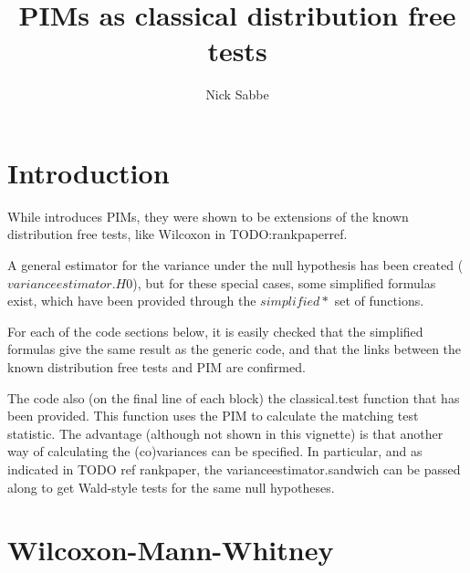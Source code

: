 \documentclass[12pt]{article}
\author{Nick Sabbe}
\begin{document}

\title{PIMs as classical distribution free tests}

\maketitle
\tableofcontents
\section{Introduction}

While \cite{Thas2012} introduces PIMs, they were shown to be extensions of the known distribution free tests, like Wilcoxon in TODO:rankpaperref.

A general estimator for the variance under the null hypothesis has been created ($varianceestimator.H0$), but for these special cases, some simplified
formulas exist, which have been provided through the $simplified*$ set of functions.

For each of the code sections below, it is easily checked that the simplified formulas give the same result as the generic code, and that the 
links between the known distribution free tests and PIM are confirmed.

The code also (on the final line of each block) the classical.test function that has been provided. This function uses the PIM to calculate the 
matching test statistic. The advantage (although not shown in this vignette) is that another way of calculating the (co)variances can be specified.
In particular, and as indicated in TODO ref rankpaper, the varianceestimator.sandwich can be passed along to get Wald-style tests for the same
null hypotheses.

\section{Wilcoxon-Mann-Whitney}\label{S_WMW}
\end{document}
